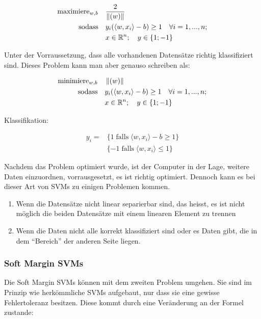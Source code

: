 \begin{align*}
	\operatorname{maximiere}_{w,b} \quad & \frac{2}{\left\lVert(w)\right\rVert} \\
	\operatorname{sodass} \quad &y_{i}(\langle w,x_{i} \rangle -b) \geq 1 \quad \forall  i = 1,...,n ; \\
	&x \in \mathbb{R}^n; \quad	y \in \{1;-1\}
\end{align*}

Unter der Vorraussetzung, dass alle vorhandenen Datensätze richtig klassifiziert sind. Dieses Problem kann 
man aber genauso schreiben als:

\begin{align*}
		\operatorname{minimiere}_{w,b} \quad & \left\lVert(w)\right\rVert \\
		\operatorname{sodass} \quad &y_{i}(\langle w,x_{i} \rangle -b) \geq 1 \quad \forall i = 1,...,n ; \\
		&x \in \mathbb{R}^n; \quad y \in \{1; -1\}
\end{align*}

Klassifikation:

\begin{align*}
	y_{i} =& \{ 1 \operatorname{falls} \langle w,x_{i} \rangle - b \geq 1\} \\
		& \{ -1 \operatorname{falls} \langle w,x_{i} \rangle \leq 1\}
\end{align*}

Nachdem das Problem optimiert wurde, ist der Computer in der Lage, weitere Daten einzuordnen, vorrausgesetzt, es ist richtig optimiert.
Dennoch kann es bei dieser Art von SVMs zu einigen Problemen kommen.

\begin{enumerate}
	\item Wenn die Datensätze nicht linear separierbar sind, das heisst, es ist nicht möglich die beiden Datensätze mit einem linearen Element zu trennen
	\item Wenn die Daten nicht alle korrekt klassifiziert sind oder es Daten gibt, die in dem "`Bereich"' der anderen Seite liegen.
\end{enumerate}

\subsubsection{Soft Margin SVMs}
Die Soft Margin SVMs können mit dem zweiten Problem umgehen.
Sie sind im Prinzip wie herkömmliche SVMs aufgebaut, nur dass sie eine gewisse Fehlertoleranz besitzen. Diese kommt durch eine Veränderung an der Formel zustande:

